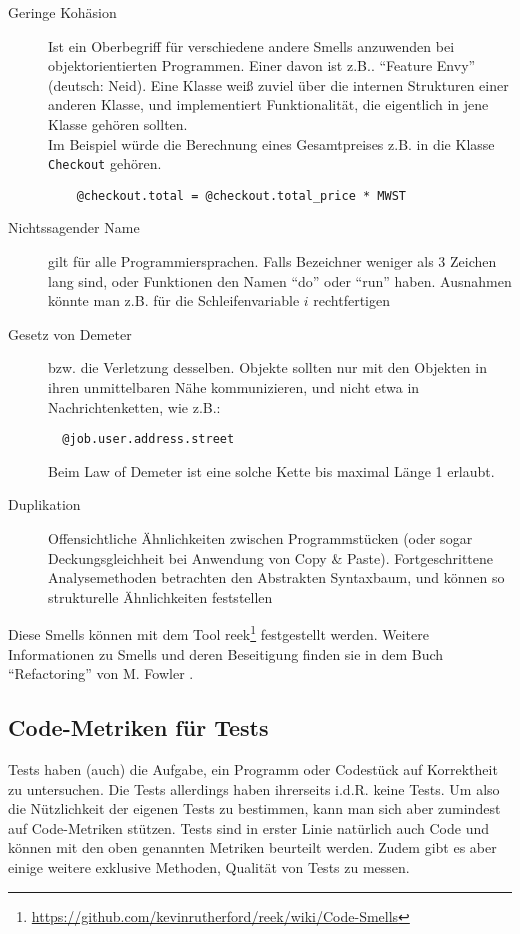 \begin{description}
 \item[Geringe Kohäsion] Ist ein Oberbegriff für verschiedene andere Smells anzuwenden bei objektorientierten Programmen. Einer davon ist z.B.. "`Feature Envy"' (deutsch: Neid). Eine Klasse weiß zuviel über die internen Strukturen einer anderen Klasse, und implementiert Funktionalität, die eigentlich in jene Klasse gehören sollten. \\
 Im Beispiel würde die Berechnung eines Gesamtpreises z.B. in die Klasse \texttt{Checkout} gehören.
 \begin{lstlisting}
    @checkout.total = @checkout.total_price * MWST
 \end{lstlisting}
 \item[Nichtssagender Name] gilt für alle Programmiersprachen. Falls Bezeichner weniger als 3 Zeichen lang sind, oder Funktionen den Namen "`do"' oder "`run"' haben. Ausnahmen könnte man z.B. für die Schleifenvariable $i$ rechtfertigen
 \item[Gesetz von Demeter] bzw. die Verletzung desselben. Objekte sollten nur mit den Objekten in ihren unmittelbaren Nähe kommunizieren, und nicht etwa in Nachrichtenketten, wie z.B.:
 \begin{lstlisting}
  @job.user.address.street
 \end{lstlisting}
 Beim Law of Demeter ist eine solche Kette bis maximal Länge 1 erlaubt.
 \item[Duplikation] Offensichtliche Ähnlichkeiten zwischen Programmstücken (oder sogar Deckungsgleichheit bei Anwendung von Copy \& Paste). Fortgeschrittene Analysemethoden betrachten den Abstrakten Syntaxbaum, und können so strukturelle Ähnlichkeiten feststellen
 \end{description}

Diese Smells können mit dem Tool reek\footnote{\url{https://github.com/kevinrutherford/reek/wiki/Code-Smells}} festgestellt werden.
Weitere Informationen zu Smells und deren Beseitigung finden sie in dem Buch "`Refactoring"' von M. Fowler \citep{fowler_refactoring_1999}.

\subsection{Code-Metriken für Tests}
\label{sec:metrics}
Tests haben (auch) die Aufgabe, ein Programm oder Codestück auf Korrektheit zu untersuchen. Die Tests allerdings haben ihrerseits i.d.R. keine Tests. Um also die Nützlichkeit der eigenen Tests zu bestimmen, kann man sich aber zumindest auf Code-Metriken stützen.
Tests sind in erster Linie natürlich auch Code und können mit den oben genannten Metriken beurteilt werden. Zudem gibt es aber einige weitere exklusive Methoden, Qualität von Tests zu messen.


